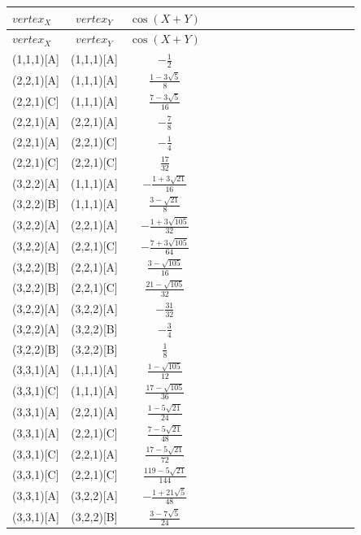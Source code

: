 \documentclass[11pt]{article}
\begin{document}
\begin{longtable}{ | p{2cm}| *{15}{c|} }
\hline
$vertex_X$ & $vertex_Y$ & $\cos(X+Y)$ \\
\hline\endhead
\hline
$vertex_X$ & $vertex_Y$ & $\cos(X+Y)$ \\
\hline\endfoot
(1,1,1)[A] & (1,1,1)[A] & $-\frac{1}{2}$\\ %
(2,2,1)[A] & (1,1,1)[A] & $\frac{1-3\sqrt{5}}{8}$\\ %
(2,2,1)[C] & (1,1,1)[A] & $\frac{7-3\sqrt{5}}{16}$\\ %
(2,2,1)[A] & (2,2,1)[A] & $-\frac{7}{8}$\\ %
(2,2,1)[A] & (2,2,1)[C] & $-\frac{1}{4}$\\ %
(2,2,1)[C] & (2,2,1)[C] & $\frac{17}{32}$\\ %
(3,2,2)[A] & (1,1,1)[A] & $-\frac{1+3\sqrt{21}}{16}$\\ %
(3,2,2)[B] & (1,1,1)[A] & $\frac{3-\sqrt{21}}{8}$\\ %
(3,2,2)[A] & (2,2,1)[A] & $-\frac{1+3\sqrt{105}}{32}$\\ %
(3,2,2)[A] & (2,2,1)[C] & $-\frac{7+3\sqrt{105}}{64}$\\ %
(3,2,2)[B] & (2,2,1)[A] & $\frac{3-\sqrt{105}}{16}$\\ %
(3,2,2)[B] & (2,2,1)[C] & $\frac{21-\sqrt{105}}{32}$\\ %
(3,2,2)[A] & (3,2,2)[A] & $-\frac{31}{32}$\\ %
(3,2,2)[A] & (3,2,2)[B] & $-\frac{3}{4}$\\ %
(3,2,2)[B] & (3,2,2)[B] & $\frac{1}{8}$\\ %
(3,3,1)[A] & (1,1,1)[A] & $\frac{1-\sqrt{105}}{12}$\\ %
(3,3,1)[C] & (1,1,1)[A] & $\frac{17-\sqrt{105}}{36}$\\ %
(3,3,1)[A] & (2,2,1)[A] & $\frac{1-5\sqrt{21}}{24}$\\ %
(3,3,1)[A] & (2,2,1)[C] & $\frac{7-5\sqrt{21}}{48}$\\ %
(3,3,1)[C] & (2,2,1)[A] & $\frac{17-5\sqrt{21}}{72}$\\ %
(3,3,1)[C] & (2,2,1)[C] & $\frac{119-5\sqrt{21}}{144}$\\ %
(3,3,1)[A] & (3,2,2)[A] & $-\frac{1+21\sqrt{5}}{48}$\\ %
(3,3,1)[A] & (3,2,2)[B] & $\frac{3-7\sqrt{5}}{24}$\\ %

\end{longtable}
\end{document}

